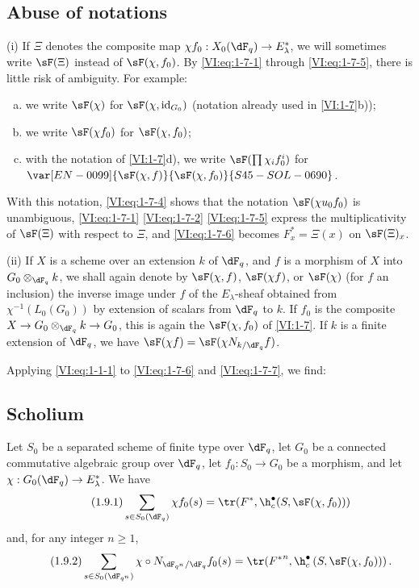 \subsection{Abuse of notations}\label{VI:1-8}

(i) If $\Xi$ denotes the composite map 
$\chi f_0:X_0(\dF_q) \to E_\lambda^\ast$, we will sometimes write $\sF(\Xi)$ 
instead of $\sF(\chi,f_0)$. By \eqref{VI:eq:1-7-1} through \eqref{VI:eq:1-7-5}, 
there is little risk of ambiguity. For example:
\begin{enumerate}[a)]
  \item we write $\sF(\chi)$ for $\sF(\chi,\operatorname{id}_{G_0})$ 
    (notation already used in \ref{VI:1-7}b)); 
  \item we write $\sF(\chi f_0)$ for $\sF(\chi,f_0)$;
  \item with the notation of \ref{VI:1-7}d), we write 
    $\sF(\prod \chi_i f_0^i)$ for $\var[EN-0099]{\sF(\chi,f)}{\sF(\chi,f_0)}{S45-SOL-0690}$. 
\end{enumerate}

With this notation, \eqref{VI:eq:1-7-4} shows that the notation 
$\sF(\chi u_0 f_0)$ is unambiguous, \eqref{VI:eq:1-7-1} \eqref{VI:eq:1-7-2} 
\eqref{VI:eq:1-7-5} express the multiplicativity of $\sF(\Xi)$ with respect to $\Xi$, 
and \eqref{VI:eq:1-7-6} becomes $F_x^\ast = \Xi(x)$ on $\sF(\Xi)_x$.

(ii) If $X$ is a scheme over an extension $k$ of $\dF_q$, and $f$ is a 
morphism of $X$ into $G_0\otimes_{\dF_q} k$, we shall again denote by $\sF(\chi,f)$, 
$\sF(\chi f)$, or $\sF(\chi)$ (for $f$ an inclusion) the inverse image under 
$f$ of the $E_\lambda$-sheaf obtained from $\chi^{-1}(L_0(G_0))$ by extension of 
scalars from $\dF_q$ to $k$. If $f_0$ is the composite 
$X\to G_0\otimes_{\dF_q} k \to G_0$, this is again the $\sF(\chi,f_0)$ of 
\ref{VI:1-7}. If $k$ is a finite extension of $\dF_q$, we have 
$\sF(\chi f) = \sF(\chi N_{k/\dF_q} f)$. 

Applying \eqref{VI:eq:1-1-1} to \eqref{VI:eq:1-7-6} and \eqref{VI:eq:1-7-7}, 
we find: 





\subsection{Scholium}\label{VI:1-9}
Let $S_0$ be a separated scheme of finite type over $\dF_q$, let $G_0$ be a 
connected commutative algebraic group over $\dF_q$, let $f_0:S_0\to G_0$ be a morphism, and let 
$\chi:G_0(\dF_q) \to E_\lambda^\ast$. We have 
\begin{equation*}\tag{1.9.1}\label{VI:eq:1-9-1}
  \sum_{s\in S_0(\dF_q)} \chi f_0(s) = \tr(F^\ast,\h_c^\bullet(S,\sF(\chi,f_0))) 
\end{equation*}
and, for any integer $n\geqslant 1$,
\begin{equation*}\tag{1.9.2}\label{VI:eq:1-9-2}
  \sum_{s\in S_0(\dF_{q^n})} \chi\circ N_{\dF_{q^n}/\dF_q} f_0(s) = \tr({F^\ast}^n, \h_c^\bullet\left(S,\sF(\chi,f_0))\right) \text{.}
\end{equation*}






